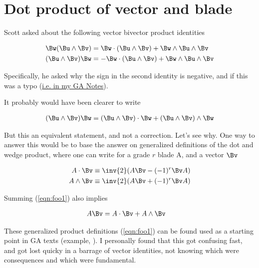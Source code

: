 

\chapter{Dot product of vector and blade}
\label{chap:dotBlade}
{}
\date{Aug 11, 2009}

\beginArtWithToc

Scott asked about the following vector bivector product identities

\begin{align}
\Bw (\Bu \wedge \Bv) &= \Bw \cdot (\Bu \wedge \Bv) + \Bw \wedge \Bu \wedge \Bv \\
(\Bu \wedge \Bv) \Bw &= - \Bw \cdot (\Bu \wedge \Bv) + \Bw \wedge \Bu \wedge \Bv
\end{align}

Specifically, he asked why the sign in the second identity is negative, and if this was a typo (\href{http://sites.google.com/site/peeterjoot/math2009/gabook.pdf}{i.e. in my GA Notes}).

It probably would have been clearer to write

\begin{align*}
(\Bu \wedge \Bv) \Bw = (\Bu \wedge \Bv) \cdot \Bw + (\Bu \wedge \Bv) \wedge \Bw
\end{align*}

But this an equivalent statement, and not a correction.  Let's see why.  One way to answer this would be to base the answer on generalized definitions of the dot and wedge product, where one can write for a grade $r$ blade A, and a vector $\Bv$

\begin{align}\label{eqn:foo1}
A \cdot \Bv &\equiv \inv{2} (A \Bv -(-1)^r \Bv A) \\
A \wedge \Bv &\equiv \inv{2} (A \Bv +(-1)^r \Bv A) \\
\end{align}

Summing (\ref{eqn:foo1}) also implies 

\begin{align}\label{eqn:foo2}
A \Bv &= A \cdot \Bv + A \wedge \Bv
\end{align}

These generalized product definitions (\ref{eqn:foo1}) can be found used as a starting point in GA texts (example, \cite{hestenes1999nfc}).  I personally found that this got confusing fast, and got lost quicky in a barrage of vector identities, not knowing which were consequences and which were fundamental.


